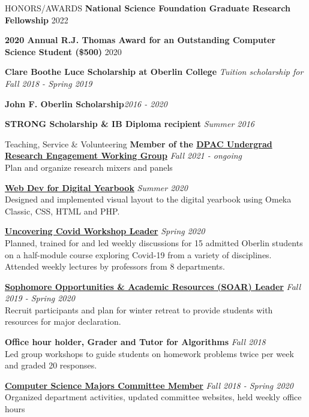 \documentclass{resume}
\begin{document}
\begin{rSection}{HONORS/AWARDS}
{\bf National Science Foundation Graduate Research Fellowship} \hfill{2022} 

{\bf 2020 Annual R.J. Thomas Award for an Outstanding Computer Science Student (\$500)} \hfill{2020} 

{\bf Clare Boothe Luce Scholarship at Oberlin College} \hfill{\em Tuition scholarship for Fall 2018 - Spring 2019} 

{\bf John F. Oberlin Scholarship}\hfill{\em 2016 - 2020} 

{\bf STRONG Scholarship \& IB Diploma recipient }\hfill{\em Summer 2016}

\end{rSection}

\begin{rSection}{Teaching, Service \& Volunteering} 
{\bf Member of the \href{https://scs-phd-deans-committee.github.io/working-groups}{DPAC Undergrad Research Engagement Working Group}} \hfill{\em Fall 2021 - ongoing} \\
Plan and organize research mixers and panels

{\bf \href{https://www.oc2020.oberlincollegelibrary.org/}{Web Dev for Digital Yearbook}} \hfill{\em Summer 2020} \\
Designed and implemented visual layout to the digital yearbook using Omeka Classic, CSS, HTML and PHP.

{\bf \href{https://www.oberlin.edu/admissions-and-aid/for-accepted-students/virtual-visits/covid-19-course}{Uncovering Covid Workshop Leader}} \hfill{\em Spring 2020} \\
Planned, trained for and led weekly discussions for 15 admitted Oberlin students on a half-module course exploring Covid-19 from a variety of disciplines. Attended weekly lectures by professors from 8 departments.

{\bf \href{https://www.oberlin.edu/career/set/soar/soar-leaders}{Sophomore Opportunities \& Academic Resources (SOAR) Leader}} \hfill{\em Fall 2019 - Spring 2020} \\
Recruit participants and plan for winter retreat to provide students with resources for major declaration.

{\bf Office hour holder, Grader and Tutor for Algorithms} \hfill {\em Fall 2018} \\
{ Led group workshops to guide students on homework problems twice per week and graded 20 responses.} 

\href{http://www.cs.oberlin.edu/~csmc/officers.php}{\textbf{Computer Science Majors Committee Member}} \hfill {\em Fall 2018 - Spring 2020} \\
{ Organized department activities, updated committee websites, held weekly office hours} 


\end{rSection}
\end{document}
